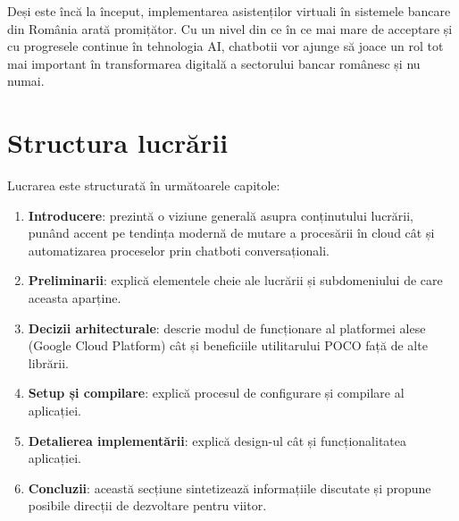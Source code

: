 Deși este încă la început, implementarea asistenților virtuali în sistemele bancare din România arată promițător. Cu un nivel din ce în ce mai mare de acceptare și cu progresele continue în tehnologia AI, chatbotii vor ajunge să joace un rol tot mai important în transformarea digitală a sectorului bancar românesc și nu numai.

\section{Structura lucrării}

Lucrarea este structurată în următoarele capitole:

\begin{enumerate}
    \item \textbf{Introducere}: prezintă o viziune generală asupra conținutului lucrării, punând accent pe tendința modernă de mutare a procesării în cloud cât și automatizarea proceselor prin chatboti conversaționali.
    \item \textbf{Preliminarii}: explică elementele cheie ale lucrării și subdomeniului de care aceasta aparține.
    \item \textbf{Decizii arhitecturale}: descrie modul de funcționare al platformei alese (Google Cloud Platform) cât și beneficiile utilitarului POCO față de alte librării.
    \item \textbf{Setup și compilare}: explică procesul de configurare și compilare al aplicației.
    \item \textbf{Detalierea implementării}: explică design-ul cât și funcționalitatea aplicației.
    \item \textbf{Concluzii}: această secțiune sintetizează informațiile discutate și propune posibile direcții de dezvoltare pentru viitor.
\end{enumerate}